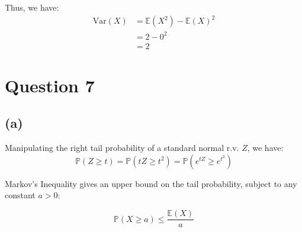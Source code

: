 \documentclass[12pt]{article}
\begin{document}
\noindent Thus, we have: \begin{align*}
    \text{Var}(X) &= \mathbb{E}(X^{2}) - \mathbb{E}(X)^{2} \\ 
    &= 2 - 0^{2} \\ 
    &= \boxed{2}
\end{align*}

\newpage

\section*{Question 7}

\subsection*{(a)}
Manipulating the right tail probability of a standard normal r.v. $Z$, we have:
\begin{equation}
    \mathbb{P}(Z \geq t) = \mathbb{P}(tZ \geq t^{2}) = \mathbb{P}(e^{tZ} \geq e^{t^{2}})
\end{equation}

\noindent Markov's Inequality gives an upper bound on the tail probability, subject to any constant $a > 0$: 

\begin{equation}
    \mathbb{P}(X \geq a) \leq \frac{\mathbb{E}(X)}{a}
\end{equation} \\





\end{document}
